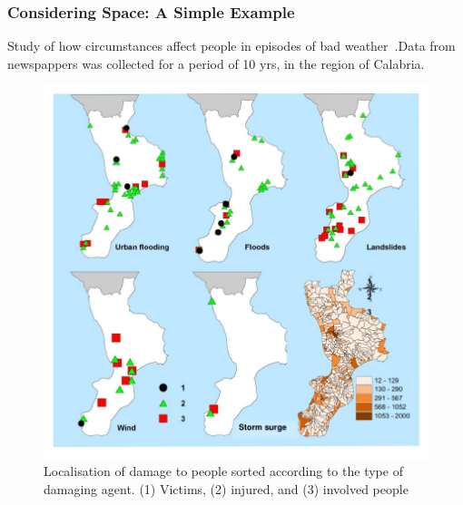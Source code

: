 \documentclass[hyperref={pdfpagelabels=true}]{beamer}
\begin{document}
\begin{frame}
\frametitle{Considering Space: A Simple Example}
Study of how circumstances affect people in episodes of bad weather~\cite{calabria}.Data from newspappers was collected for a period of 10 yrs, in the region of Calabria.
\begin{figure}
\includegraphics[scale=0.55]{damage_agent.png}
\caption{\tiny{Localisation of damage to people sorted according to the type of damaging agent. (1) Victims, (2) injured, and (3) involved people~\cite{calabria}}}
\end{figure}
\end{frame}
\end{document}
